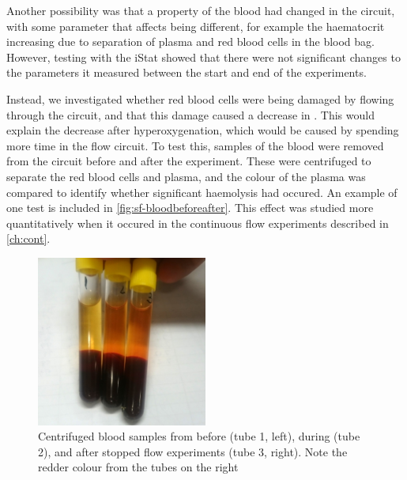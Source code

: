Another possibility was that a property of the blood had changed in the circuit, with some parameter that affects \Ttwo being different, for example the haematocrit increasing due to separation of plasma and red blood cells in the blood bag.
However, testing with the iStat showed that there were not significant changes to the parameters it measured between the start and end of the experiments.

Instead, we investigated whether red blood cells were being damaged by flowing through the circuit, and that this damage caused a decrease in \Ttwo.
This would explain the \Ttwo decrease after hyperoxygenation, which would be caused by spending more time in the flow circuit.
To test this, samples of the blood were removed from the circuit before and after the experiment.
These were centrifuged to separate the red blood cells and plasma, and the colour of the plasma was compared to identify whether significant haemolysis had occured.
An example of one test is included in \autoref{fig:sf-bloodbeforeafter}.
This effect was studied more quantitatively when it occured in the continuous flow experiments described in \autoref{ch:cont}.

\begin{figure}[t]
\centering
\includegraphics[width=0.5\textwidth]{figures/stoppedflow/samplecheck.jpg}
\caption[Centrifuged blood samples from start and end of experiment]{Centrifuged blood samples from before (tube 1, left), during (tube 2), and after stopped flow experiments (tube 3, right). Note the redder colour from the tubes on the right}
\label{fig:sf-bloodbeforeafter}
\end{figure}

